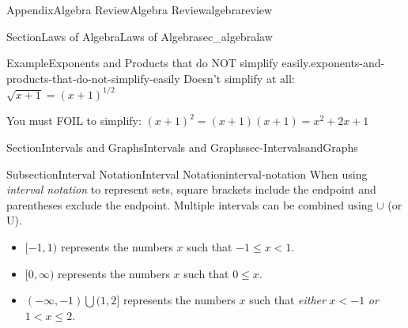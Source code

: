 \documentclass[oneside,10pt,]{tufte-book}
\numberwithin{equation}{chapter}
\begin{document}
\begin{appendixptx}{Appendix}{Algebra Review}{}{Algebra Review}{}{}{algebrareview}
\begin{sectionptx}{Section}{Laws of Algebra}{}{Laws of Algebra}{}{}{sec_algebralaw}
\begin{example}{Example}{Exponents and Products that do NOT simplify easily.}{exponents-and-products-that-do-not-simplify-easily}
Doesn't simplify at all: \(\sqrt{x+1} = (x+1)^{1/2}\)%
\par
You must FOIL to simplify: \((x+1)^2 = (x+1)(x+1) = x^2 + 2x + 1\)%
\end{example}
\end{sectionptx}
%
%
\typeout{************************************************}
\typeout{************************************************}
%
\begin{sectionptx}{Section}{Intervals and Graphs}{}{Intervals and Graphs}{}{}{sec-IntervalsandGraphs}
%
%
\typeout{************************************************}
\typeout{************************************************}
%
\begin{subsectionptx}{Subsection}{Interval Notation}{}{Interval Notation}{}{}{interval-notation}
When using \emph{interval notation} to represent sets, square brackets include the endpoint and parentheses exclude the endpoint. Multiple intervals can be combined using \(\cup\) (or U).%
\par
%
\begin{itemize}[label=\textbullet]
\item{}\([-1,1)\) represents the numbers \(x\) such that \(-1\leq x <1\).%
\begin{image}{0.25}{0.5}{0.25}{}%
%
\end{image}%
\item{}\([0,\infty)\) represents the numbers \(x\) such that \(0\leq x \).%
\begin{image}{0.25}{0.5}{0.25}{}%
%
\end{image}%
\item{}\((-\infty,-1)\bigcup (1,2]\) represents the numbers \(x\) such that \emph{either} \(x<-1\) \emph{or} \(1<x\leq 2\).%

\end{itemize}
\end{subsectionptx}
\end{sectionptx}
\end{appendixptx}
\end{document}

